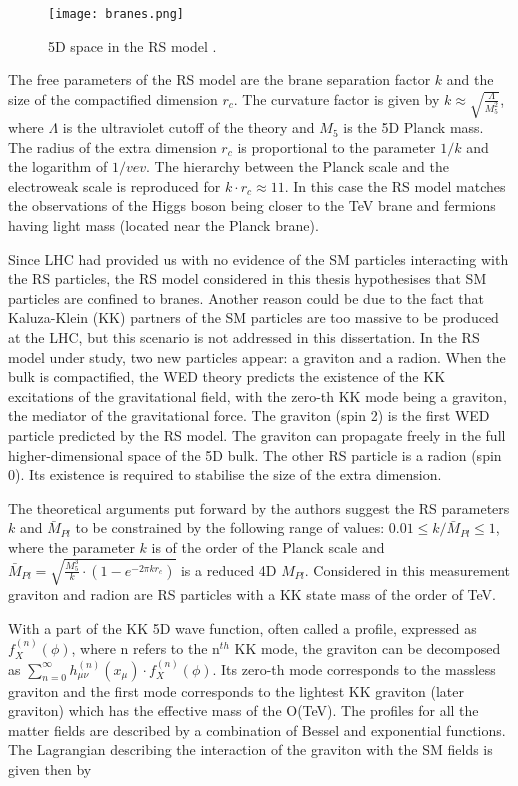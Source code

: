 \begin{figure}[H]
\centering
\texttt{[image: branes.png]}
\caption[RS branes]{5D space in the RS model \cite{Xanda}.}
\label{branes}
\end{figure}




The free parameters of the RS model are the brane separation factor $k$ and the size of the compactified dimension $r_c$. The curvature factor is given by $k \approx \sqrt{ \frac{\Lambda}{M^2_5}  }$, where $\Lambda$ is the ultraviolet cutoff of the theory and $M_5$ is the 5D Planck mass. The radius of the extra dimension $r_c$ is proportional to the parameter $1/k$ and the logarithm of $1/vev$. The hierarchy between the Planck scale and the electroweak scale is reproduced for $k \cdot r_c \approx 11$. In this case the RS model matches the observations of the Higgs boson being closer to the TeV brane and fermions having light mass (located near the Planck brane).


Since LHC had provided us with no evidence of the SM particles interacting with the RS particles, the RS model considered in this thesis hypothesises that SM particles are confined to branes. Another reason could be due to the fact that Kaluza-Klein (KK) \cite{Uzawa:1999pg} partners of the SM particles are too massive to be produced at the LHC, but this scenario is not addressed in this dissertation. In the RS model under study, two new particles appear: a graviton and a radion. When the bulk is compactified, the WED theory predicts the existence of the KK excitations of the gravitational field, with the zero-th KK mode being a graviton, the mediator of the gravitational force. The graviton (spin 2) is the first WED particle predicted by the RS model. The graviton can propagate freely in the full higher-dimensional space of the 5D bulk. The other RS particle is a radion (spin 0). Its existence is required to stabilise the size of the extra dimension. 


The theoretical arguments 	put forward by the authors \cite{Davoudiasl:1999jd} suggest the RS parameters $k$ and $\bar{M}_{Pl}$ to be constrained by the following range of values: $0.01 \leq k / \bar{M}_{Pl} \leq 1$, where the parameter $k$ is of the order of the Planck scale and $\bar{M}_{Pl} = \sqrt{\frac{M^3_5}{k} \cdot (1 - e^{-2\pi k r_c} ) }$ is a reduced 4D $M_{Pl}$. Considered in this measurement graviton and radion are RS particles with a KK state mass of the order of TeV. 

With a part of the KK 5D wave function, often called a profile, expressed as $f^{(n)}_X(\phi)$, where n refers to the n$^{th}$ KK mode, the graviton can be decomposed as $\sum_{n=0}^{\infty} h^{(n)}_{\mu\nu}(x_\mu) \cdot f^{(n)}_X(\phi)$. Its zero-th mode corresponds to the massless graviton and the first mode corresponds to the lightest KK graviton (later graviton) which has the effective mass of the O(TeV). The profiles for all the matter fields are described by a combination of Bessel and exponential functions. The Lagrangian describing the interaction of the graviton with the SM fields is given then by 

